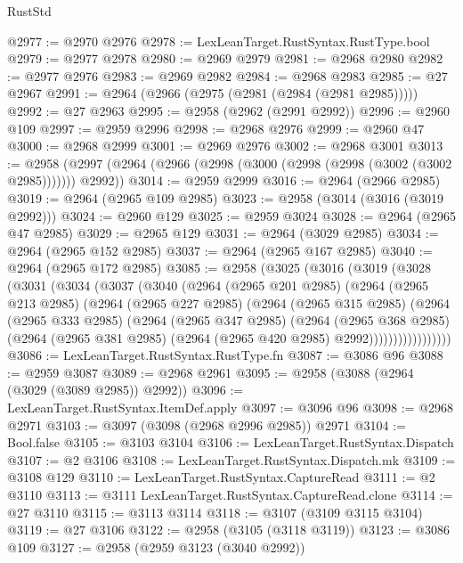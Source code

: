 \begin{lexlean}{RustStd}
\begin{coremodule}
@2977 := @2970 @2976
@2978 := LexLeanTarget.RustSyntax.RustType.bool
@2979 := @2977 @2978
@2980 := @2969 @2979
@2981 := @2968 @2980
@2982 := @2977 @2976
@2983 := @2969 @2982
@2984 := @2968 @2983
@2985 := @27 @2967
@2991 := @2964 (@2966 (@2975 (@2981 (@2984 (@2981 @2985)))))
@2992 := @27 @2963
@2995 := @2958 (@2962 (@2991 @2992))
@2996 := @2960 @109
@2997 := @2959 @2996
@2998 := @2968 @2976
@2999 := @2960 @47
@3000 := @2968 @2999
@3001 := @2969 @2976
@3002 := @2968 @3001
@3013 := @2958 (@2997 (@2964 (@2966 (@2998 (@3000 (@2998 (@2998 (@3002 (@3002 @2985))))))) @2992))
@3014 := @2959 @2999
@3016 := @2964 (@2966 @2985)
@3019 := @2964 (@2965 @109 @2985)
@3023 := @2958 (@3014 (@3016 (@3019 @2992)))
@3024 := @2960 @129
@3025 := @2959 @3024
@3028 := @2964 (@2965 @47 @2985)
@3029 := @2965 @129
@3031 := @2964 (@3029 @2985)
@3034 := @2964 (@2965 @152 @2985)
@3037 := @2964 (@2965 @167 @2985)
@3040 := @2964 (@2965 @172 @2985)
@3085 := @2958
    (@3025
      (@3016
        (@3019
          (@3028
            (@3031
              (@3034
                (@3037
                  (@3040
                    (@2964
                      (@2965 @201 @2985)
                      (@2964
                        (@2965 @213 @2985)
                        (@2964
                          (@2965 @227 @2985)
                          (@2964
                            (@2965 @315 @2985)
                            (@2964
                              (@2965 @333 @2985)
                              (@2964
                                (@2965 @347 @2985)
                                (@2964
                                  (@2965 @368 @2985)
                                  (@2964
                                    (@2965 @381 @2985)
                                    (@2964 (@2965 @420 @2985) @2992)))))))))))))))))
@3086 := LexLeanTarget.RustSyntax.RustType.fn
@3087 := @3086 @96
@3088 := @2959 @3087
@3089 := @2968 @2961
@3095 := @2958 (@3088 (@2964 (@3029 (@3089 @2985)) @2992))
@3096 := LexLeanTarget.RustSyntax.ItemDef.apply
@3097 := @3096 @96
@3098 := @2968 @2971
@3103 := @3097 (@3098 (@2968 @2996 @2985)) @2971
@3104 := Bool.false
@3105 := @3103 @3104
@3106 := LexLeanTarget.RustSyntax.Dispatch
@3107 := @2 @3106
@3108 := LexLeanTarget.RustSyntax.Dispatch.mk
@3109 := @3108 @129
@3110 := LexLeanTarget.RustSyntax.CaptureRead
@3111 := @2 @3110
@3113 := @3111 LexLeanTarget.RustSyntax.CaptureRead.clone
@3114 := @27 @3110
@3115 := @3113 @3114
@3118 := @3107 (@3109 @3115 @3104)
@3119 := @27 @3106
@3122 := @2958 (@3105 (@3118 @3119))
@3123 := @3086 @109
@3127 := @2958 (@2959 @3123 (@3040 @2992))

\end{coremodule}
\end{lexlean}
